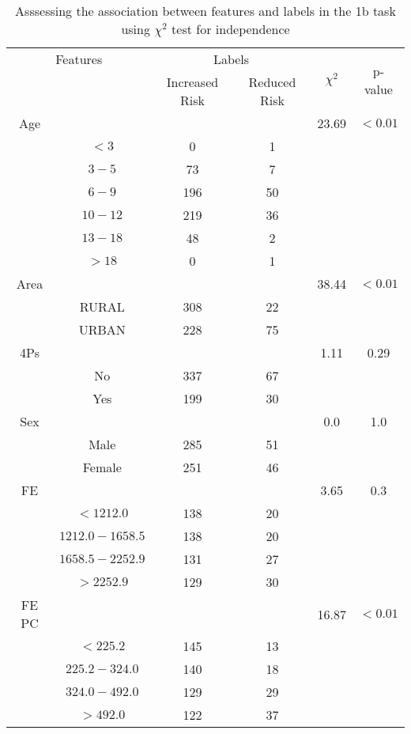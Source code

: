 \begin{table}[!htb]
\centering
\caption{Asssessing the association between features and labels in the 1b task using $\chi^2$ test for independence}
\label{tab:chitest_1b}
\begin{tabular}{c c | c c| c | c}
\hline
\multicolumn{2}{c|}{Features}& \multicolumn{2}{c|}{Labels}& \multirow{2}{*}{$\chi^2$} & \multirow{2}{*}{p-value}\\ 
& & Increased Risk & Reduced Risk & & \\ 
\hline
Age &  &  & & 23.69 & $< 0.01$ \\ 
& $< 3$ & 0 & 1& & \\ 
& $3-5$ & 73 & 7& & \\ 
& $6-9$ & 196 & 50& & \\ 
& $10-12$ & 219 & 36& & \\ 
& $13-18$ & 48 & 2& & \\ 
& $> 18$ & 0 & 1& & \\ 
\hline 
Area &  &  & & 38.44 & $< 0.01$ \\ 
& RURAL & 308 & 22& & \\ 
& URBAN & 228 & 75& & \\ 
\hline 
4Ps &  &  & & 1.11 & 0.29 \\ 
& No & 337 & 67& & \\ 
& Yes & 199 & 30& & \\ 
\hline 
Sex &  &  & & 0.0 & 1.0 \\ 
& Male & 285 & 51& & \\ 
& Female & 251 & 46& & \\ 
\hline 
FE &  &  & & 3.65 & 0.3 \\ 
& $< 1212.0$ & 138 & 20& & \\ 
& $1212.0-1658.5$ & 138 & 20& & \\ 
& $1658.5-2252.9$ & 131 & 27& & \\ 
& $> 2252.9$ & 129 & 30& & \\ 
\hline 
FE PC &  &  & & 16.87 & $< 0.01$ \\ 
& $< 225.2$ & 145 & 13& & \\ 
& $225.2-324.0$ & 140 & 18& & \\ 
& $324.0-492.0$ & 129 & 29& & \\ 
& $> 492.0$ & 122 & 37& & \\ 
\hline 
\end{tabular}
\end{table}
